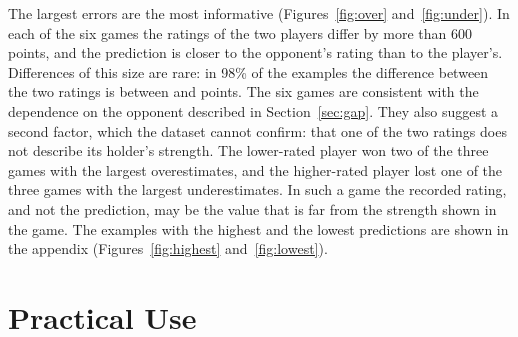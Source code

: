 \documentclass[11pt]{article}
\begin{document}
The largest errors are the most informative
(Figures~\ref{fig:over} and~\ref{fig:under}). In each of the six games the
ratings of the two players differ by more than 600 points, and the prediction
is closer to the opponent's rating than to the player's. Differences of this
size are rare: in 98\% of the examples the difference between the two ratings
is between  and  points. The
six games are consistent with the dependence on the opponent described in
Section~\ref{sec:gap}. They also suggest a second factor, which the dataset
cannot confirm: that one of the two ratings does not describe its holder's
strength. The lower-rated player won two of the three games with the largest
overestimates, and the higher-rated player lost one of the three games with
the largest underestimates. In such a game the recorded rating, and not the
prediction, may be the value that is far from the strength shown in the game.
The
examples with the highest and the lowest predictions are shown in the
appendix (Figures~\ref{fig:highest} and~\ref{fig:lowest}).



\fi

\section{Practical Use}
\label{sec:use}
\end{document}
